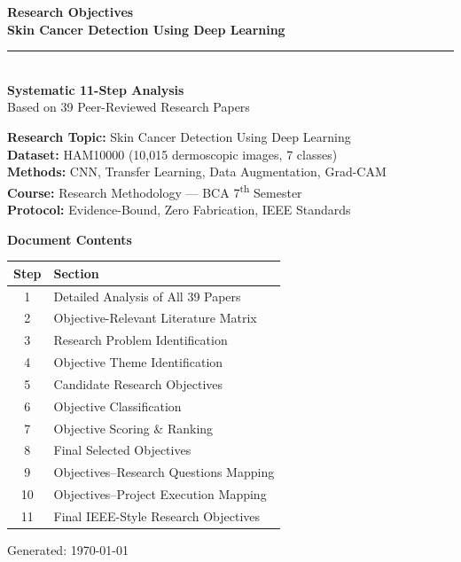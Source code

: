 \documentclass[11pt,a4paper]{article}
\begin{document}
\begin{titlepage}
\begin{center}
\vspace*{1cm}

{\Huge\bfseries\color{navyblue} Research Objectives}\\[0.4cm]
{\LARGE\bfseries\color{navyblue!75} Skin Cancer Detection Using Deep Learning}\\[1cm]

\textcolor{navyblue}{\rule{0.8\textwidth}{1.5pt}}\\[0.8cm]

{\Large\bfseries Systematic 11-Step Analysis}\\[0.3cm]
{\large Based on 39 Peer-Reviewed Research Papers}\\[1.5cm]

\begin{tcolorbox}[
  enhanced, width=0.85\textwidth,
  colback=navyblue!5, colframe=navyblue!50,
  boxrule=0.8pt, arc=5pt,
]
\begin{center}
\textbf{Research Topic:} Skin Cancer Detection Using Deep Learning\\[4pt]
\textbf{Dataset:} HAM10000 (10,015 dermoscopic images, 7 classes)\\[4pt]
\textbf{Methods:} CNN, Transfer Learning, Data Augmentation, Grad-CAM\\[4pt]
\textbf{Course:} Research Methodology --- BCA 7\textsuperscript{th} Semester\\[4pt]
\textbf{Protocol:} Evidence-Bound, Zero Fabrication, IEEE Standards
\end{center}
\end{tcolorbox}

\vspace{1.5cm}

{\large\textbf{Document Contents}}\\[0.3cm]
\begin{tabular}{cl}
\toprule
\textbf{Step} & \textbf{Section} \\
\midrule
1  & Detailed Analysis of All 39 Papers \\
2  & Objective-Relevant Literature Matrix \\
3  & Research Problem Identification \\
4  & Objective Theme Identification \\
5  & Candidate Research Objectives \\
6  & Objective Classification \\
7  & Objective Scoring \& Ranking \\
8  & Final Selected Objectives \\
9  & Objectives--Research Questions Mapping \\
10 & Objectives--Project Execution Mapping \\
11 & Final IEEE-Style Research Objectives \\
\bottomrule
\end{tabular}

\vfill
{\small Generated: \today}
\end{center}
\end{titlepage}
\end{document}
